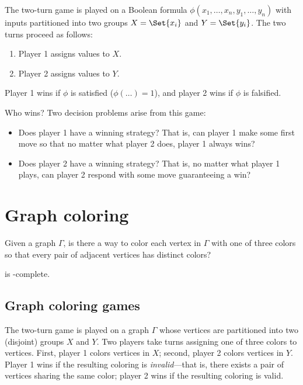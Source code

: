 \begin{definition}%
  The two-turn \SAT{} game is played on a Boolean formula \(\phi(x_1, \dots,
  x_n, y_1, \dots, y_n)\) with inputs partitioned into two groups \(X =
  \Set{x_i}\) and \(Y = \Set{y_i}\).  The two turns proceed as follows:
  \begin{enumerate}
    \item Player 1 assigns values to \(X\).
    \item Player 2 assigns values to \(Y\).
  \end{enumerate}
  Player 1 wins if \(\phi\) is satisfied (\(\phi(\dots) = 1\)), and player 2
  wins if \(\phi\) is falsified.

  Who wins?  Two decision problems arise from this game:
  \begin{itemize}
    \item Does player 1 have a winning strategy?  That is, can player 1 make
      some first move so that no matter what player 2 does, player 1 always
      wins?

    \item Does player 2 have a winning strategy?  That is, no matter what
      player 1 plays, can player 2 respond with some move guaranteeing a win?
  \end{itemize}

\end{definition}


\section{Graph coloring}

\begin{definition}%
  Given a graph \(\Gamma\), is there a way to color each vertex in  \(\Gamma\)
  with one of three colors so that every pair of adjacent vertices has distinct
  colors?
\end{definition}

\begin{theorem}
   is \NP-complete.
\end{theorem}

\subsection{Graph coloring games}

\begin{definition}%
  The two-turn  game is played on a graph \(\Gamma\) whose
  vertices are partitioned into two (disjoint) groups \(X\) and \(Y\).  Two
  players take turns assigning one of three colors to vertices.  First, player
  1 colors vertices in \(X\); second, player 2 colors  vertices in \(Y\).
  Player 1 wins if the resulting coloring is \emph{invalid}---that is, there
  exists a pair of vertices sharing the same color; player 2 wins if the
  resulting coloring is valid.

\end{definition}

